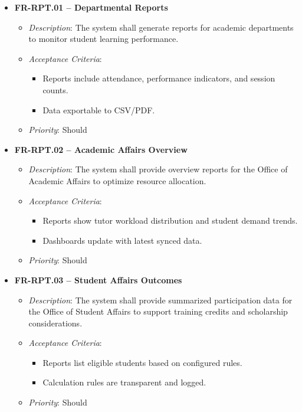 \begin{itemize}
    \item \textbf{FR-RPT.01 – Departmental Reports}
        \begin{itemize}
            \item \textit{Description}: The system shall generate reports for academic departments to monitor student learning performance.
            \item \textit{Acceptance Criteria}:
                \begin{itemize}
                    \item Reports include attendance, performance indicators, and session counts.
                    \item Data exportable to CSV/PDF.
                \end{itemize}  
            \item \textit{Priority}: Should
        \end{itemize}
    \item \textbf{FR-RPT.02 – Academic Affairs Overview}
        \begin{itemize}
            \item \textit{Description}: The system shall provide overview reports for the Office of Academic Affairs to optimize resource allocation.
            \item \textit{Acceptance Criteria}:
                \begin{itemize}
                    \item Reports show tutor workload distribution and student demand trends.
                    \item Dashboards update with latest synced data.
                \end{itemize}  
            \item \textit{Priority}: Should
        \end{itemize}
    \item \textbf{FR-RPT.03 – Student Affairs Outcomes}
        \begin{itemize}
            \item \textit{Description}: The system shall provide summarized participation data for the Office of Student Affairs to support training credits and scholarship considerations.
            \item \textit{Acceptance Criteria}:
                \begin{itemize}
                    \item Reports list eligible students based on configured rules.
                    \item Calculation rules are transparent and logged.
                \end{itemize}  
            \item \textit{Priority}: Should
        \end{itemize}
\end{itemize}

